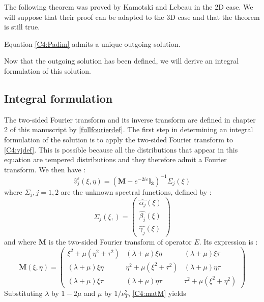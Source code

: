 The following theorem was proved by Kamotski and Lebeau \cite{KamotskiLebeau} in the 2D case. We will suppose that their proof can be adapted to the 3D case and that the theorem is still true.
\begin{theorem}
Equation \eqref{C4:Padim} admits a unique outgoing solution.
\end{theorem}
Now that the outgoing solution has been defined, we will derive an integral formulation of this solution.

\subsection{Integral formulation}
The two-sided Fourier transform and its inverse transform are defined in chapter 2 of this manuscript by \eqref{fullfourierdef}. The first step in determining an integral formulation of the solution is to apply the two-sided Fourier transform to \eqref{C4:vjdef}. This is possible because all the distributions that appear in this equation are tempered distributions and they therefore admit a Fourier transform. We then have :
\begin{equation}
\hat{v}^{\varepsilon}_j(\xi,\eta)=(\mathbf{M}-e^{-2i\varepsilon}\mathbf{\mathbb{I}_3})^{-1}\Sigma_j(\xi)
\label{C4:matMvjeps}
\end{equation}
where $\Sigma_j, j=1,2$  are the unknown spectral functions, defined by :
\begin{equation}
\Sigma_j(\xi,)=\begin{pmatrix}
\hat{\alpha_j}(\xi)\\ \hat{\beta_j}(\xi) \\ \hat{\gamma_j}(\xi)
\end{pmatrix}
\label{C4:sigmacomponents}
\end{equation}
and where \textbf{M} is the two-sided Fourier transform of operator $E$. Its expression is :
\begin{equation}
\mathbf{M}(\xi,\eta)=
\begin{pmatrix}
\xi^2+\mu(\eta^2+\tau^2) & (\lambda+\mu)\xi \eta & (\lambda+\mu)\xi\tau \\
 (\lambda+\mu)\xi \eta & \eta^2+\mu(\xi^2+\tau^2) & (\lambda+\mu)\eta\tau \\
(\lambda+\mu)\xi\tau & (\lambda+\mu)\eta\tau & \tau^2+\mu(\xi^2+\eta^2) 
\end{pmatrix}
\label{C4:matM}
\end{equation}
Substituting $\lambda$ by $1-2\mu$ and $\mu$ by $1/\nu_T^2$, \eqref{C4:matM} yields
